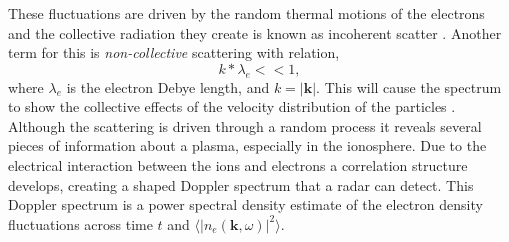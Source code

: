 These fluctuations are driven by the random thermal motions of the electrons and the collective radiation they create is known as incoherent scatter \cite{kudeki:milla:1}. Another term for this is \textit{non-collective} scattering with relation,
\begin{equation}
\label{eqn:incohorig}
k*\lambda_{e} << 1,
\end{equation}
where $\lambda_{e}$ is the electron Debye length, and $k=|\mathbf{k}|$. This will cause the spectrum to show the collective effects of the velocity distribution of the particles \cite{sheffield2010}.
Although the scattering is driven through a random process it reveals several pieces of information about a plasma, especially in the ionosphere. Due to the electrical interaction between the ions and electrons a correlation structure develops, creating a shaped Doppler spectrum that a radar can detect. This Doppler spectrum is a power spectral density estimate of the electron density fluctuations across time $t$ and $\langle \left|n_e(\mathbf{k},\omega)\right|^2\rangle$.

